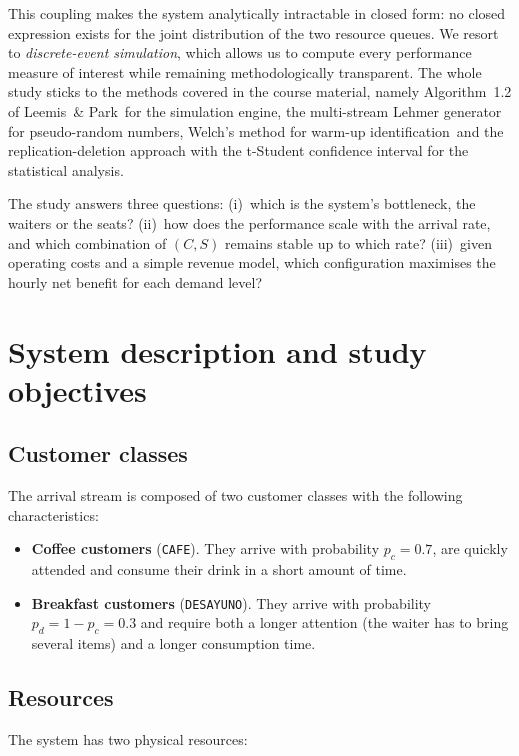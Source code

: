 \documentclass[11pt,a4paper]{article}
\begin{document}
This coupling makes the system analytically intractable in closed form:
no closed expression exists for the joint distribution of the two
resource queues. We resort to \emph{discrete-event simulation}, which
allows us to compute every performance measure of interest while
remaining methodologically transparent. The whole study sticks to the
methods covered in the course material, namely Algorithm~1.2 of
Leemis~\& Park\,\cite{leemis_park} for the simulation engine, the
multi-stream Lehmer generator\,\cite{leemis_park} for pseudo-random
numbers, Welch's method for warm-up
identification\,\cite{leemis_park, kurkowski_manet} and the
replication-deletion approach with the t-Student confidence interval
for the statistical analysis.

The study answers three questions:
(i)~which is the system's bottleneck, the waiters or the seats?
(ii)~how does the performance scale with the arrival rate, and which
combination of $(C,S)$ remains stable up to which rate?
(iii)~given operating costs and a simple revenue model, which
configuration maximises the hourly net benefit for each demand level?

\section{System description and study objectives}

\subsection{Customer classes}
The arrival stream is composed of two customer classes with the following
characteristics:

\begin{itemize}
\item \textbf{Coffee customers} ({\tt CAFE}). They arrive with probability
$p_c = 0.7$, are quickly attended and consume their drink in a short
amount of time.
\item \textbf{Breakfast customers} ({\tt DESAYUNO}). They arrive with
probability $p_d = 1 - p_c = 0.3$ and require both a longer attention
(the waiter has to bring several items) and a longer consumption time.
\end{itemize}

\subsection{Resources}
The system has two physical resources:
\end{document}
